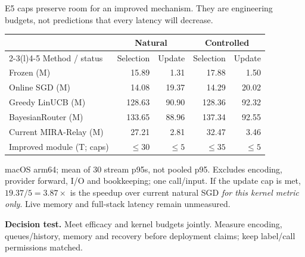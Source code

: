 \documentclass[10pt,letterpaper]{article}
\newcommand{\T}[1]{{\color{GuideBlue}#1}}
\newcommand{\note}[1]{{\fontsize{8.5}{10.5}\selectfont #1\par}}
\newcommand{\sectionhead}[1]{\vspace{7pt}{\large\bfseries #1}\par\vspace{3pt}}
\newenvironment{clean}{\begin{center}\fontsize{9.5}{11.5}\selectfont\setlength{\tabcolsep}{8pt}\renewcommand{\arraystretch}{1.10}}{\end{center}}
\begin{document}
\newpage
\sectionhead{4. Retain efficiency while adding useful capacity}
E5 caps preserve room for an improved mechanism. They are engineering budgets, not predictions that every latency will decrease.
\par\noindent\begin{minipage}{\linewidth}\end{minipage}\par
\begin{clean}
\begin{tabular}{@{}lrrrr@{}}
\toprule
& \multicolumn{2}{c}{Natural} & \multicolumn{2}{c}{Controlled} \\
\cmidrule(lr){2-3}\cmidrule(l){4-5}
Method / status & Selection & Update & Selection & Update \\
\midrule
Frozen (M) & 15.89 & 1.31 & 17.88 & 1.50 \\
Online SGD (M) & 14.08 & 19.37 & 14.29 & 20.02 \\
Greedy LinUCB (M) & 128.63 & 90.90 & 128.36 & 92.32 \\
BayesianRouter (M) & 133.65 & 88.96 & 137.34 & 92.55 \\
Current MIRA-Relay (M) & 27.21 & 2.81 & 32.47 & 3.46 \\
\midrule
\T{Improved module (T; caps)} & \T{$\leq30$} & \T{$\leq5$} & \T{$\leq35$} & \T{$\leq5$} \\

\bottomrule
\end{tabular}
\end{clean}
\note{macOS arm64; mean of 30 stream p95s, not pooled p95. Excludes encoding, provider forward, I/O and bookkeeping; one call/input. If the update cap is met, $19.37/5=3.87\times$ is the speedup over current natural SGD \emph{for this kernel metric only}. Live memory and full-stack latency remain unmeasured.}
\textbf{Decision test.} Meet efficacy and kernel budgets jointly. Measure encoding, queues/history, memory and recovery before deployment claims; keep label/call permissions matched.
\end{document}
